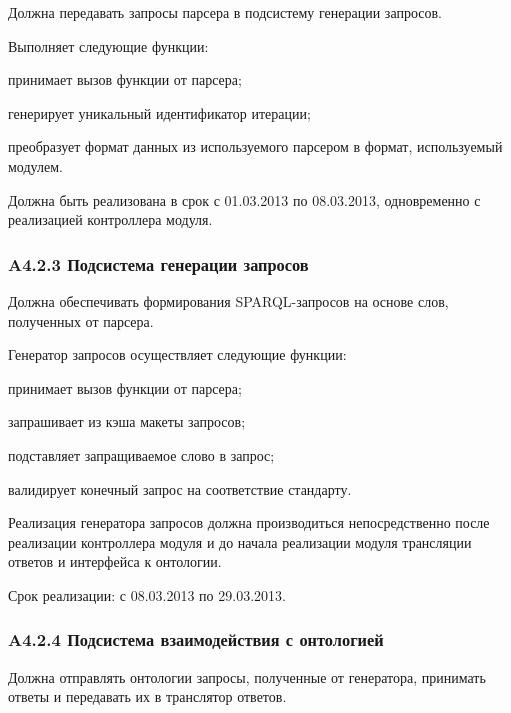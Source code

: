Должна передавать запросы парсера в подсистему генерации запросов.

Выполняет следующие функции:
\begin{list}{}{\leftmargin=1.5cm}
  \item принимает вызов функции от парсера;
  \item генерирует уникальный идентификатор итерации;
  \item преобразует формат данных из используемого парсером в формат, используемый модулем.
\end{list}

Должна быть реализована в срок с 01.03.2013 по 08.03.2013, одновременно с реализацией контроллера модуля.

\subsubsection*{A4.2.3 Подсистема генерации запросов}

Должна обеспечивать формирования SPARQL-запросов на основе слов, полученных от парсера.

Генератор запросов осуществляет следующие функции:
\begin{list}{}{\leftmargin=1.5cm}
  \item принимает вызов функции от парсера;
  \item запрашивает из кэша макеты запросов;
  \item подставляет запращиваемое слово в запрос;
  \item валидирует конечный запрос на соответствие стандарту.
\end{list}

Реализация генератора запросов должна производиться непосредственно после реализации контроллера модуля и до начала реализации модуля трансляции ответов и интерфейса к онтологии.

Срок реализации: с 08.03.2013 по 29.03.2013.

\subsubsection*{A4.2.4 Подсистема взаимодействия с онтологией}

Должна отправлять онтологии запросы, полученные от генератора, принимать ответы и передавать их в транслятор ответов.


